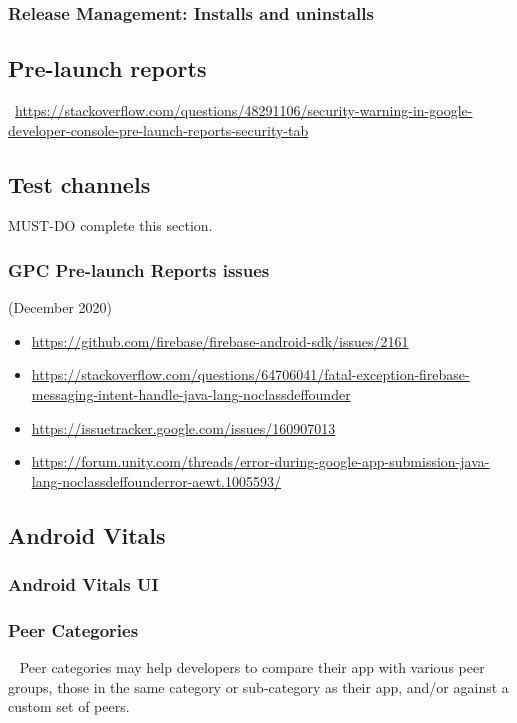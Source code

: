 \subsubsection{Release Management: Installs and uninstalls}




\subsection{Pre-launch reports}

~\url{https://stackoverflow.com/questions/48291106/security-warning-in-google-developer-console-pre-launch-reports-security-tab}

\subsection{Test channels}\label{subsection-test-channels}
MUST-DO complete this section.

\subsubsection{GPC Pre-launch Reports issues}
(December 2020)

\begin{itemize}
    \item \url{https://github.com/firebase/firebase-android-sdk/issues/2161}
    \item \url{https://stackoverflow.com/questions/64706041/fatal-exception-firebase-messaging-intent-handle-java-lang-noclassdeffounder}
    \item \url{https://issuetracker.google.com/issues/160907013}
    \item \url{https://forum.unity.com/threads/error-during-google-app-submission-java-lang-noclassdeffounderror-aewt.1005593/}    
\end{itemize}







\subsection{Android Vitals}
\subsubsection{Android Vitals UI}

\subsubsection{Peer Categories}~\label{section-peer-categories}
Peer categories may help developers to compare their app with various peer groups, those in the same category or sub-category as their app, and/or against a custom set of peers.

